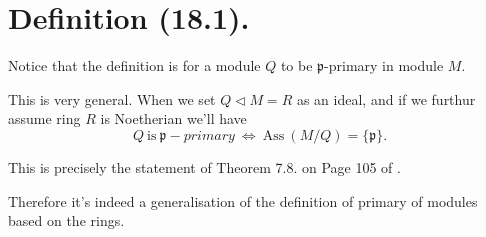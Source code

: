 
\section{Definition (18.1).}

Notice that the definition is for a module $Q$ to be $\mathfrak p$-primary in module $M$.

This is very general. When we set $Q\triangleleft M=R$ as an ideal, and if we furthur assume ring $R$ is Noetherian we'll have \[Q ~\text{is}~ \mathfrak p-primary ~\Leftrightarrow~ \text{Ass}~(M/Q)=\{\mathfrak p\}.\]

This is precisely the statement of Theorem 7.8. on Page 105 of \cite{reid1995undergraduate}.

Therefore it's indeed a generalisation of the definition of primary of modules based on the rings.